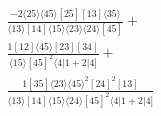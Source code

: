 \documentclass[varwidth, border=5pt]{standalone}
\begin{document}
\begin{my}
$\begin{gathered}
\scriptscriptstyle\frac{-2⟨25⟩⟨45⟩[25][13]⟨35⟩}{⟨13⟩[14]⟨15⟩⟨23⟩⟨24⟩[45]}+\\
\scriptscriptstyle\frac{1[12]⟨45⟩[23][34]}{⟨15⟩[45]^2⟨4|1+2|4]}+\\
\scriptscriptstyle\frac{1[35]⟨23⟩⟨45⟩^2[24]^2[13]}{⟨13⟩[14]⟨15⟩⟨24⟩[45]^2⟨4|1+2|4]}\phantom{+}
\end{gathered}$
\end{my}
\end{document}
